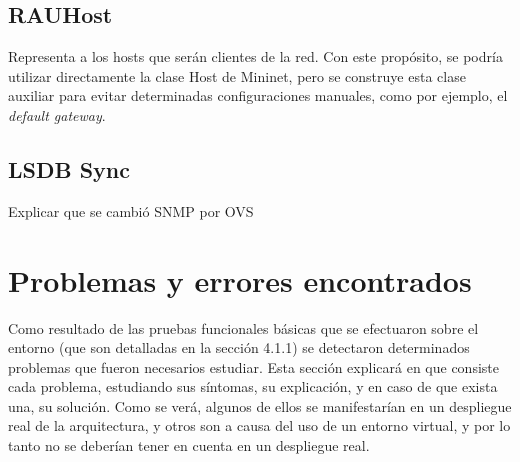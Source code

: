 \subsection{RAUHost}
Representa a los hosts que serán clientes de la red. Con este propósito, se podría utilizar directamente la clase Host de Mininet, pero se construye esta clase auxiliar para evitar determinadas configuraciones manuales, como por ejemplo, el \textit{default gateway}.

\subsection{LSDB Sync}
Explicar que se cambió SNMP por OVS

\section{Problemas y errores encontrados}
Como resultado de las pruebas funcionales básicas que se efectuaron sobre el entorno (que son detalladas en la sección 4.1.1) se detectaron determinados problemas que fueron necesarios estudiar. Esta sección explicará en que consiste cada problema, estudiando sus síntomas, su explicación, y en caso de que exista una, su solución. Como se verá, algunos de ellos se manifestarían en un despliegue real de la arquitectura, y otros son a causa del uso de un entorno virtual, y por lo tanto no se deberían tener en cuenta en un despliegue real.


